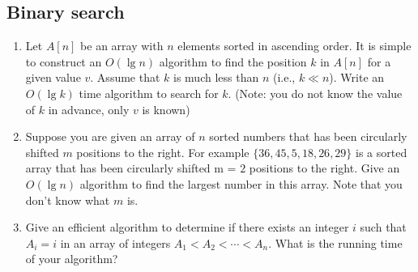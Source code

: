 \subsection{Binary search}
\begin{Exercise}
\begin{enumerate}
\item Let $A[n]$ be an array with $n$ elements sorted in ascending order. It is simple to construct an $O(\lg n)$ algorithm to find the position $k$ in $A[n]$ for a given value $v$. Assume that $k$ is much less than $n$ (i.e., $k \ll n$). Write an $O(\lg k)$ time algorithm to search for $k$.
(Note: you do not know the value of $k$ in advance, only $v$ is known) \label{sequence:exponential-search}
\item Suppose you are given an array of $n$ sorted numbers that has been circularly shifted $m$ positions to the right. For example $\{36, 45, 5, 18, 26, 29\}$ is a sorted array that has been circularly shifted m = $2$ positions to the right. Give an $O(\lg n)$ algorithm to find the largest number in this array. Note that you don't know what $m$ is. \label{sequence:shift}
\item Give an efficient algorithm to determine if there exists an integer $i$ such that $A_i = i$ in an array of integers $A_1 < A_2 < \cdots < A_n$. What is the running time of your algorithm? \label{sequence:fixed-point}
\end{enumerate}
\end{Exercise}
